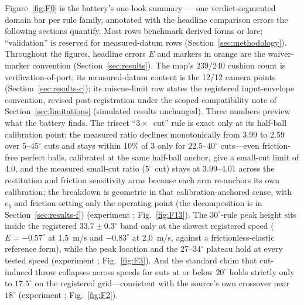 
Figure~\ref{fig:F0} is the battery's one-look summary --- one
verdict-segmented domain bar per rule family, annotated with the
headline comparison errors the following sections quantify. Most rows
benchmark derived forms or lore; ``validation'' is reserved for
measured-datum rows (Section~\ref{sec:methodology}). Throughout the
figures, headline errors $E$ and markers in orange are the
waiver-marker convention (Section~\ref{sec:results}). The map's
239/240 cushion count is verification-of-port; its measured-datum
content is the 12/12 camera points (Section~\ref{sec:results-c}); its
miscue-limit row states the registered input-envelope convention,
revised post-registration under the scoped compatibility note of
Section~\ref{sec:limitations} (simulated results unchanged).
Three numbers preview what the battery finds. The trisect
``$3\times$~cut'' rule is exact only at its half-ball calibration point:
the measured ratio declines monotonically from 3.99 to 2.59 over
$5$--$45^\circ$ cuts and stays within 10\% of 3 only for
$22.5$--$40^\circ$ cuts---even friction-free perfect balls, calibrated
at the same half-ball anchor, give a small-cut limit of 4.0, and the
measured small-cut ratio ($5^\circ$ cut) stays at 3.99--4.01 across the
restitution and friction
sensitivity arms because each arm re-anchors its own calibration; the
breakdown is geometric in that calibration-anchored sense, with $e_b$
and friction setting only the operating point (the decomposition is in
Section~\ref{sec:results-f}) (experiment ; Fig.~\ref{fig:F13}). The
$30^\circ$-rule peak height sits inside the registered
$33.7\pm0.3^\circ$ band only at the slowest registered speed
($E = -0.57^\circ$ at 1.5~m/s and $-0.83^\circ$ at 2.0~m/s, against a
frictionless-elastic reference form), while the peak location and the
$27$--$34^\circ$ plateau hold at every tested speed (experiment
;
Fig.~\ref{fig:F3}). And the standard claim that cut-induced throw
collapses across speeds for cuts at or below $20^\circ$ holds strictly
only to $17.5^\circ$ on the registered grid---consistent with the
source's own crossover near $18^\circ$ (experiment ;
Fig.~\ref{fig:F2}).


